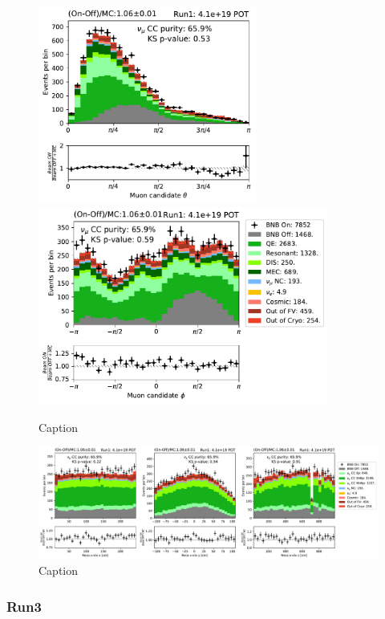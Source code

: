 \begin{figure}
    \centering
    \includegraphics[height=6.5cm]{NuMuCCsel/Images/run1/numu_theta_run1.pdf} \hspace{2mm}
    \includegraphics[height=6.5cm]{NuMuCCsel/Images/run1/numu_phi_run1.pdf}
    \caption{Caption}
    \label{fig:numu_angles}
\end{figure}

\begin{figure}
    \centering
    \includegraphics[width=\textwidth]{NuMuCCsel/Images/run1/numu_recovtx_run1.pdf}
    \caption{Caption}
    \label{fig:numu_vtx}
\end{figure}

\subsubsection{Run3}
\label{sssec:NuMUCCsel:INC:Run3}

